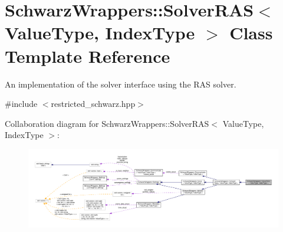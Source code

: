 \hypertarget{classSchwarzWrappers_1_1SolverRAS}{}\section{Schwarz\+Wrappers\+:\+:Solver\+R\+AS$<$ Value\+Type, Index\+Type $>$ Class Template Reference}
\label{classSchwarzWrappers_1_1SolverRAS}


An implementation of the solver interface using the R\+AS solver.  




{\ttfamily \#include $<$restricted\+\_\+schwarz.\+hpp$>$}



Collaboration diagram for Schwarz\+Wrappers\+:\+:Solver\+R\+AS$<$ Value\+Type, Index\+Type $>$\+:
\nopagebreak
\begin{figure}[H]
\begin{center}
\leavevmode
\includegraphics[width=350pt]{classSchwarzWrappers_1_1SolverRAS__coll__graph}
\end{center}
\end{figure}
